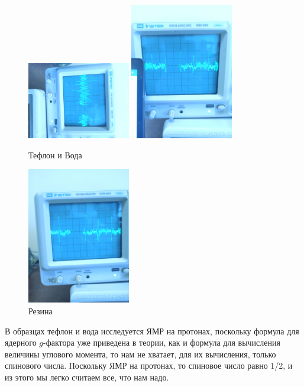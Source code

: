 \documentclass[a4paper, 12pt]{article}%
\begin{document}
\begin{figure}[h]
\begin{center}
\includegraphics[width = 0.4\textwidth]{21.jpg}
\includegraphics[width = 0.4\textwidth]{22.jpg}
\caption{Тефлон и Вода}
\end{center}
\end{figure}

\begin{figure}[h]
\begin{center}
\includegraphics[width = 0.4\textwidth]{23.jpg}
\caption{Резина}
\end{center}
\end{figure}
В образцах тефлон и вода исследуется ЯМР на протонах, поскольку формула для ядерного $g$-фактора уже приведена в теории, как и формула для вычисления величины углового момента, то нам не хватает, для их вычисления, только спинового числа. Поскольку ЯМР на протонах, то спиновое число равно 1/2, и из этого мы легко считаем все, что нам надо.
\end{document}
